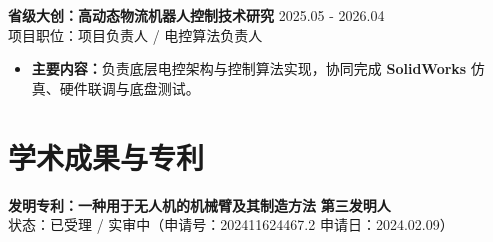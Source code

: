 \documentclass[11pt,a4paper]{article}
\begin{document}
\textbf{省级大创：高动态物流机器人控制技术研究} \hfill 2025.05 - 2026.04 \\
{\small 项目职位：项目负责人 / 电控算法负责人}
\begin{itemize}[leftmargin=1.5em, noitemsep, topsep=2pt]
    \item \textbf{主要内容：}负责底层电控架构与控制算法实现，协同完成 \textbf{SolidWorks} 仿真、硬件联调与底盘测试。
\end{itemize}

\section{学术成果与专利}
\textbf{发明专利：一种用于无人机的机械臂及其制造方法} \hfill \textbf{第三发明人} \\
{\small 状态：已受理 / 实审中（申请号：202411624467.2 \quad 申请日：2024.02.09）}
\end{document}
